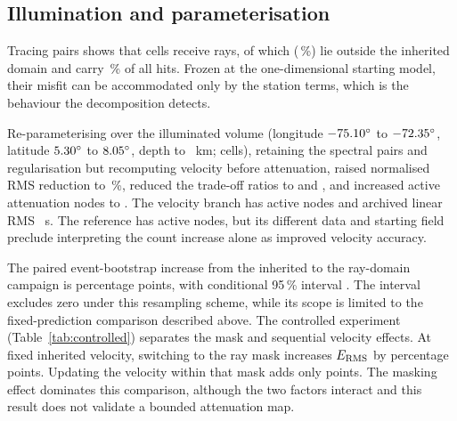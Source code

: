 \documentclass[review,authoryear,longtitle]{elsarticle}
\begin{document}
\subsection{Illumination and parameterisation}
\label{sec:parametrizacion}

Tracing \paresTrazados{} pairs shows that \celdasIluminadas{} cells
receive rays, of which \celdasFueraMascaraVieja{}
(\fracCeldasFuera\,\%) lie outside the inherited domain and carry
\fracImpactosFuera\,\% of all hits. Frozen at the one-dimensional starting
model, their misfit can be accommodated only by the station terms, which
is the behaviour the decomposition detects.

Re-parameterising over the illuminated volume
(longitude $-75.10^{\circ}$ to $-72.35^{\circ}$, latitude
$5.30^{\circ}$ to $8.05^{\circ}$, depth to \profMaxAdoptada~km;
\celdasEnMascara{} cells), retaining the spectral pairs and regularisation
but recomputing velocity before attenuation,
raised normalised RMS reduction to \explMascaraRayos\,\%, reduced the trade-off
ratios to \razonEstrMascaraRayos{} and \razonEstMascaraRayos, and
increased active attenuation nodes to \qCeldasAdoptada. The velocity
branch has \vpCeldasAdoptada{} active nodes and archived linear RMS
\vpRmsAdoptada~s. The reference has \vpCeldasPrevia{} active nodes,
but its different data and starting field preclude interpreting the count
increase alone as improved velocity accuracy.

The paired event-bootstrap increase from the inherited to the ray-domain
campaign is \auditDomainGain{} percentage points, with conditional
95\,\% interval \auditDomainGainCI. The interval excludes zero under
this resampling scheme, while its scope is limited to the fixed-prediction
comparison described above. The controlled experiment
(Table~\ref{tab:controlled}) separates the mask and sequential velocity
effects. At fixed inherited velocity, switching to the ray mask increases
$E_{\rm RMS}$ by \auditMaskGainFixedVp{} percentage points. Updating the
velocity within that mask adds only \auditVelocityGainRayMask{} points.
The masking effect dominates this comparison, although the two factors
interact and this result does not validate a bounded attenuation map.
\end{document}
